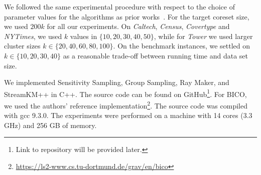 We followed the same experimental procedure with respect to the choice of parameter values for the algorithms as prior works~\cite{AckermannMRSLS12, FGSSS13}. For the target coreset size, we used $200k$ for all our experiments. On \textit{Caltech}, \textit{Census},  \textit{Covertype} and \textit{NYTimes}, we used $k$ values in $\{10, 20, 30, 40, 50\}$, while for \textit{Tower} we used larger cluster sizes $k \in \{20, 40, 60, 80, 100\}$. On the benchmark instances, we settled on $k \in \{10, 20, 30, 40\}$ as a reasonable trade-off between running time and data set size.


We implemented Sensitivity Sampling, Group Sampling, Ray Maker, and StreamKM++ in C++. The source code can be found on GitHub\footnote{Link to repository will be provided later.}. For BICO, we used the authors' reference implementation\footnote{\url{https://ls2-www.cs.tu-dortmund.de/grav/en/bico}}. The source code was compiled with gcc 9.3.0. The experiments were performed on a machine with 14 cores (3.3 GHz) and 256 GB of memory.


